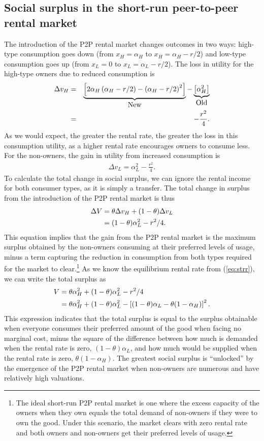 \documentclass[12pt]{article}
\begin{document}
\subsection{Social surplus in the short-run peer-to-peer rental market}
The introduction of the P2P rental market changes outcomes in two ways: 
high-type consumption goes down (from $x_H = \alpha_H$ to  $x_H = \alpha_H - r/2$) and low-type consumption goes up (from $x_L = 0$ to $x_L = \alpha_L - r/2$). 
The loss in utility for the high-type owners due to reduced consumption is 
\begin{eqnarray}
\Delta v_H &=& \underbrace{\left[2 \alpha_H \left(\alpha_H - r/2\right) - \left(\alpha_H - r/2\right)^2 \right]}_{\mbox{New}} - 
                             \underbrace{\left[\alpha_H^2 \right]}_{\mbox{Old}}   \notag \\
           &=& - \frac{r^2}{4}. 
\end{eqnarray} 
As we would expect, the greater the rental rate, the greater the loss in this consumption utility, as a higher rental rate encourages owners to consume less. 
For the non-owners, the gain in utility from increased consumption is
\begin{align}
\Delta v_L = \alpha_L^2 - \frac{r^2}{4}. 
\end{align} 
To calculate the total change in social surplus, we can ignore the rental income for both consumer types, as it is simply a transfer. 
The total change in surplus from the introduction of the P2P rental market is thus 
\begin{align}
\Delta V &= \theta \Delta v_H + (1-\theta) \Delta v_L \notag \\ 
         & = (1-\theta) \alpha_L^2 - r^2/4.
\end{align}
This equation implies that the gain from the P2P rental market is the
maximum surplus obtained by the non-owners consuming at their
preferred levels of usage, minus a term capturing the reduction in consumption from both types required for the market to clear.\footnote{
  The ideal short-run P2P rental market is one where the excess capacity of the owners when they own equals the total demand of non-owners if they were to own the good.
  Under this scenario, the market clears with zero rental rate and both owners and non-owners get their preferred levels of usage. 
}
As we know the equilibrium rental rate from (\ref{eq:strr}), we can write the total surplus as
\begin{align}
  V & = \theta \alpha_H^2 + (1-\theta)\alpha_L^2 - r^2/4 \notag \\
    & = \theta \alpha_H^2 + (1-\theta)\alpha_L^2 - \left[(1-\theta) \alpha_L - \theta (1-\alpha_H) \right]^2.
\end{align} 
This expression indicates that the total surplus is equal to the surplus obtainable when everyone consumes their preferred amount of the good when facing no marginal cost, minus the square of the difference between how much is demanded when the rental rate is zero, $(1-\theta)\alpha_L$, and how much would be supplied when the rental rate is zero, $\theta (1-\alpha_H)$.
The greatest social surplus is ``unlocked'' by the emergence of the P2P rental market when non-owners are numerous and have relatively high valuations. 
\end{document}

